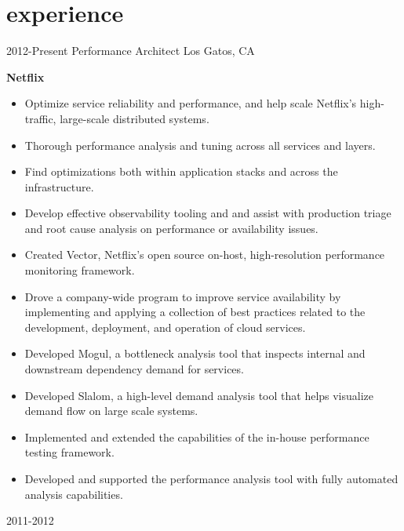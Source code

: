\section{experience}

\begin{entrylist}
  \entry
    {2012-Present}
    {Performance Architect}
    {Los Gatos, CA}
    {
      \textbf{Netflix}
      \begin{itemize}
        \item Optimize service reliability and performance, and help scale Netflix's high-traffic, large-scale distributed systems.
        \item Thorough performance analysis and tuning across all services and layers.
        \item Find optimizations both within application stacks and across the infrastructure.
        \item Develop effective observability tooling and and assist with production triage and root cause analysis on performance or availability issues.  
      \end{itemize}
      \begin{itemize}
        \item Created Vector, Netflix's open source on-host, high-resolution performance monitoring framework.
        \item Drove a company-wide program to improve service availability by implementing and applying a collection of best practices related to the development, deployment, and operation of cloud services.
        \item Developed Mogul, a bottleneck analysis tool that inspects internal and downstream dependency demand for services.
        \item Developed Slalom, a high-level demand analysis tool that helps visualize demand flow on large scale systems.
        \item Implemented and extended the capabilities of the in-house performance testing framework.
        \item Developed and supported the performance analysis tool with fully automated analysis capabilities.
      \end{itemize}
    }
  \entry
    {2011-2012}

\end{entrylist}
